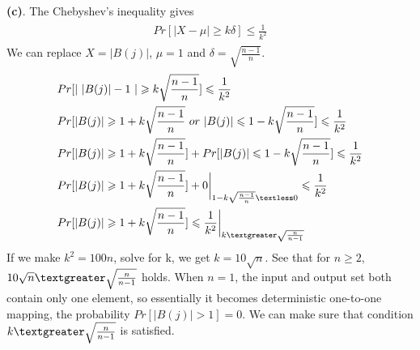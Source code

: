 \documentclass[titlepage, paper=a4, fontsize=11pt]{scrartcl} %
\numberwithin{equation}{section} %
\numberwithin{figure}{section} %
\numberwithin{table}{section} %
\begin{document}
\textbf{(c)}. The Chebyshev's inequality gives
\begin{align*} 
\begin{split}
Pr[|X-\mu| \geqslant k\delta] \leqslant \frac{1}{k^2}
\end{split}					
\end{align*}
We can replace $X = |B(j)|$, $\mu = 1$ and $\delta = \sqrt{\frac{n-1}{n}}$.
\begin{align*} 
\begin{split}
&Pr[|\ |B(j)|-1\ | \geqslant k\sqrt{\frac{n-1}{n}}] \leqslant \frac{1}{k^2} \\
&Pr[|B(j)| \geqslant 1+k\sqrt{\frac{n-1}{n}} \ or \ |B(j)| \leqslant 1-k\sqrt{\frac{n-1}{n}}] \leqslant \frac{1}{k^2} \\
&Pr[|B(j)| \geqslant 1+k\sqrt{\frac{n-1}{n}}] + Pr[|B(j)| \leqslant 1-k\sqrt{\frac{n-1}{n}}] \leqslant \frac{1}{k^2} \\
&Pr[|B(j)| \geqslant 1+k\sqrt{\frac{n-1}{n}}] + 0 \bigg|_{1-k\sqrt{\frac{n-1}{n}} \textless 0} \leqslant \frac{1}{k^2} \\
&Pr[|B(j)| \geqslant 1+k\sqrt{\frac{n-1}{n}}] \leqslant \frac{1}{k^2} \bigg|_{k \textgreater \sqrt{\frac{n}{n-1}}} \\
\end{split}					
\end{align*}
If we make $k^2 = 100n$, solve for k, we get $k = 10\sqrt{n}$. See that for $n \geqslant 2$, $10\sqrt{n} \textgreater \sqrt{\frac{n}{n-1}}$ holds. When $n = 1$, the input and output set both contain only one element, so essentially it becomes deterministic one-to-one mapping, the probability $Pr[|B(j)|>1]=0$.
We can make sure that condition $k \textgreater \sqrt{\frac{n}{n-1}}$ is satisfied. \\
\end{document}
